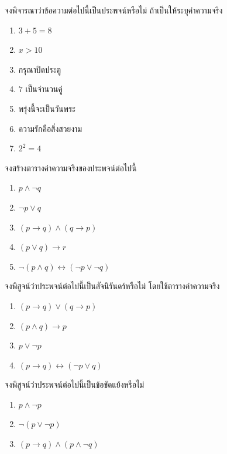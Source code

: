 \clearpage
{}

\begin{exercise}
จงพิจารณาว่าข้อความต่อไปนี้เป็นประพจน์หรือไม่ ถ้าเป็นให้ระบุค่าความจริง
\begin{enumerate}
    \item $3 + 5 = 8$
    \item $x > 10$
    \item กรุณาปิดประตู
    \item $7$ เป็นจำนวนคู่
    \item พรุ่งนี้จะเป็นวันพระ
    \item ความรักคือสิ่งสวยงาม
    \item $2^2 = 4$
\end{enumerate}
\end{exercise}

\begin{exercise}
จงสร้างตารางค่าความจริงของประพจน์ต่อไปนี้
\begin{enumerate}
    \item $p \land \neg q$
    \item $\neg p \lor q$
    \item $(p \rightarrow q) \land (q \rightarrow p)$
    \item $(p \lor q) \rightarrow r$
    \item $\neg(p \land q) \leftrightarrow (\neg p \lor \neg q)$
\end{enumerate}
\end{exercise}

\begin{exercise}
จงพิสูจน์ว่าประพจน์ต่อไปนี้เป็นสัจนิรันดร์หรือไม่ โดยใช้ตารางค่าความจริง
\begin{enumerate}
    \item $(p \rightarrow q) \lor (q \rightarrow p)$
    \item $(p \land q) \rightarrow p$
    \item $p \lor \neg p$
    \item $(p \rightarrow q) \leftrightarrow (\neg p \lor q)$
\end{enumerate}
\end{exercise}

\begin{exercise}
จงพิสูจน์ว่าประพจน์ต่อไปนี้เป็นข้อขัดแย้งหรือไม่
\begin{enumerate}
    \item $p \land \neg p$
    \item $\neg(p \lor \neg p)$
    \item $(p \rightarrow q) \land (p \land \neg q)$
\end{enumerate}
\end{exercise}

